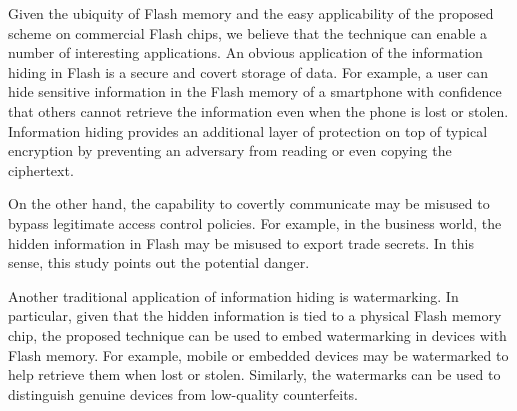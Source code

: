 
Given the ubiquity of Flash memory and the easy applicability of the proposed
scheme on commercial Flash chips, we believe that the technique can enable a
number of interesting applications. An obvious application of the information
hiding in Flash is a secure and covert storage of data.
For example, a user can hide sensitive information in the Flash memory of
a smartphone with confidence that others cannot retrieve the information
even when the phone is lost or stolen. Information hiding provides an
additional layer of protection on top of typical encryption by preventing an 
adversary from reading or even copying the ciphertext.

On the other hand, the capability to covertly communicate may be misused to
bypass legitimate access control policies. For example, in the business world,
the hidden information in Flash may be misused to export trade secrets.
In this sense, this study points out the potential danger.

Another traditional application of information hiding is watermarking. 
In particular, given that the hidden information is tied to a physical Flash
memory chip, the proposed technique can be used to embed watermarking
in devices with Flash memory. For example, mobile or embedded devices
may be watermarked to help retrieve them when lost or stolen. Similarly,
the watermarks can be used to distinguish genuine devices from low-quality
counterfeits. 
